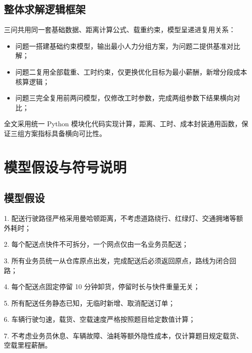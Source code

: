 \documentclass[withoutpreface,bwprint]{cumcmthesis} %
\begin{document}
\subsection{整体求解逻辑框架}
三问共用同一套基础数据、距离计算公式、载重约束，模型呈递进复用关系：

\begin{itemize}
  \item  问题一搭建基础约束模型，输出最小人力分组方案，为问题二提供基准对比解；
  \item  问题二复用全部载重、工时约束，仅更换优化目标为最小薪酬，新增分段成本核算逻辑；
  \item  问题三完全复用前两问模型，仅修改工时参数，完成两组参数下结果横向对比；
\end{itemize}
	
全文采用统一 Python 模块化代码实现计算，距离、工时、成本封装通用函数，保证三组方案指标具备横向可比性。

\section{模型假设与符号说明}
\subsection{模型假设}
1.	配送行驶路径严格采用曼哈顿距离，不考虑道路绕行、红绿灯、交通拥堵等额外耗时；
\par2.	每个配送点快件不可拆分，一个网点仅由一名业务员配送；
\par3.	所有业务员统一从仓库原点出发，完成配送后必须返回原点，路线为闭合回路；
\par4.	每个配送点固定停留 10 分钟卸货，停留时长与快件重量无关；
\par5.	所有配送任务静态已知，无临时新增、取消配送订单；
\par6.	车辆行驶匀速，载货、空载速度严格按照题目给定数值计算；
\par7.	不考虑业务员休息、车辆故障、油耗等额外隐性成本，仅计算题目规定载货、空载里程薪酬。
\end{document}
